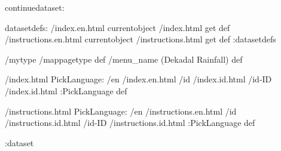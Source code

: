 \begin{ingrid}
continuedataset:

datasetdefs:
/index.en.html currentobject /index.html get def
/instructions.en.html currentobject /instructions.html get def
:datasetdefs

/mytype /mappagetype def
/menu_name (Dekadal Rainfall) def

/index.html {
PickLanguage:
/en /index.en.html
/id /index.id.html
/id-ID /index.id.html
:PickLanguage
} def

/instructions.html {
PickLanguage:
/en /instructions.en.html
/id /instructions.id.html
/id-ID /instructions.id.html
:PickLanguage
} def

:dataset
\end{ingrid}
